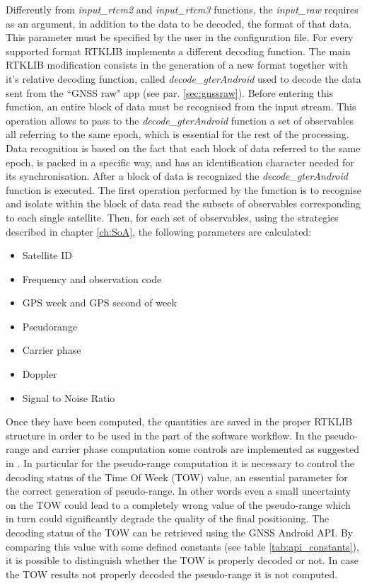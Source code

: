 Differently from \textit{input\_rtcm2} and \textit{input\_rtcm3} functions, the \textit{input\_raw} requires as an argument, in addition to the data to be decoded, the format of that data. This parameter must be specified by the user in the configuration file. For every supported format RTKLIB implements a different decoding function. The main RTKLIB modification consists in the generation of a new format together with it's relative decoding function, called \textit{decode\_gterAndroid} used to decode the data sent from the ``GNSS raw" app (see par. \ref{sec:gnssraw}). Before entering this function, an entire block of data must be recognised from the input stream. This operation allows to pass to the \textit{decode\_gterAndroid} function a set of observables all referring to the same epoch, which is essential for the rest of the processing. Data recognition is based on the fact that each block of data referred to the same epoch, is packed in a specific way, and has an identification character needed for its synchronisation. After a block of data is recognized the \textit{decode\_gterAndroid} function is executed.
The first operation performed by the function is to recognise and isolate within the block of data read the subsets of observables corresponding to each single satellite. Then, for each set of observables, using the strategies described in chapter \ref{ch:SoA}, the following parameters are calculated:
\begin{itemize}
\item Satellite ID
\item Frequency and observation code
\item GPS week and GPS second of week
\item Pseudorange
\item Carrier phase 
\item Doppler
\item Signal to Noise Ratio
\end{itemize}
Once they have been computed, the quantities are saved in the proper RTKLIB structure in order to be used in the part of the software workflow. In the pseudo-range and carrier phase computation some controls are implemented as suggested in \cite{GSA_wp:2016}. In particular for the pseudo-range computation it is necessary to control the decoding status of the Time Of Week (TOW) value, an essential parameter for the correct generation of pseudo-range. 
In other words even a small uncertainty on the TOW could lead to a completely wrong value of the pseudo-range which in turn could significantly degrade the quality of the final positioning. The decoding status of the TOW can be retrieved using the GNSS Android API. By comparing this value with some defined constants (see table \ref{tab:api_constants}), it is possible to distinguish whether the TOW is properly decoded or not. In case the TOW results not properly decoded the pseudo-range it is not computed.

